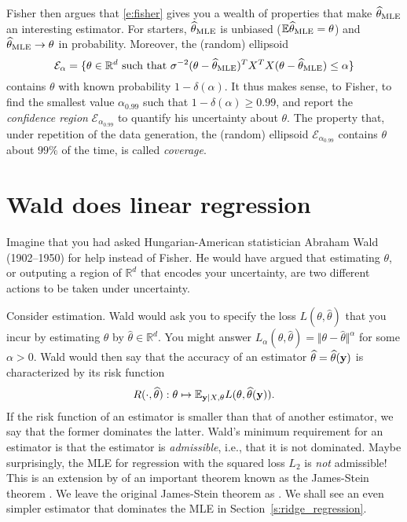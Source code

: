 Fisher then argues that \eqref{e:fisher} gives you a wealth of properties that make $\widehat{\theta}_{\text{MLE}}$ an interesting estimator.
For starters, $\widehat{\theta}_{\text{MLE}}$ is unbiased ($\mathbb E \widehat{\theta}_{\text{MLE}} = \theta$)
and $\widehat{\theta}_{\text{MLE}} \rightarrow \theta$ in probability. 
Moreover, the (random) ellipsoid 
$$
\mathcal{E}_\alpha = \{\theta\in\mathbb{R}^d \text{ such that }\sigma^{-2}(\theta-\widehat{\theta}_{\text{MLE}})^TX^T X(\theta-\widehat{\theta}_{\text{MLE}}) \leq \alpha\} 
$$
contains $\theta$ with known probability $1-\delta(\alpha)$.
It thus makes sense, to Fisher, to find the smallest value $\alpha_{0.99}$ such that $1-\delta(\alpha)\geq 0.99$, and report the \emph{confidence region} $\mathcal{E}_{\alpha_0.99}$ to quantify his uncertainty about $\theta$. 
The property that, under repetition of the data generation, the (random) ellipsoid $\mathcal{E}_{\alpha_{0.99}}$ contains $\theta$ about $99\%$ of the time, is called \emph{coverage}.

\section{Wald does linear regression}
Imagine that you had asked Hungarian-American statistician Abraham Wald (1902--1950) for help instead of Fisher.
He would have argued that estimating $\theta$, or outputing a region of $\mathbb{R}^d$ that encodes your uncertainty, are two different actions to be taken under uncertainty. 

Consider estimation. 
Wald would ask you to specify the loss $L(\theta,\widehat{\theta})$ that you incur by estimating $\theta$ by $\widehat{\theta}\in\mathbb{R}^d$. 
You might answer $L_\alpha(\theta,\widehat{\theta}) = \Vert\theta-\widehat{\theta}\Vert^\alpha$ for some $\alpha>0$.
Wald would then say that the accuracy of an estimator $\widehat{\theta}= \widehat{\theta}(\mathbf{y})$ is characterized by its risk function
\begin{equation}
    R(\cdot,\widehat{\theta}):\theta\mapsto \mathbb{E}_{\mathbf{y}\vert X, \theta} L(\theta,\widehat{\theta}(\mathbf{y})).
    \label{e:risk}
\end{equation}
If the risk function of an estimator is smaller than that of another estimator, we say that the former dominates the latter.
Wald's minimum requirement for an estimator is that the estimator is \emph{admissible}, i.e., that it is not dominated. 
Maybe surprisingly, the MLE for regression with the squared loss $L_2$ is \emph{not} admissible! 
This is an extension by \cite{TBC} of an important theorem known as the James-Stein theorem \citep{TBC}.
We leave the original James-Stein theorem as . 
We shall see an even simpler estimator that dominates the MLE in Section~\ref{s:ridge_regression}.

